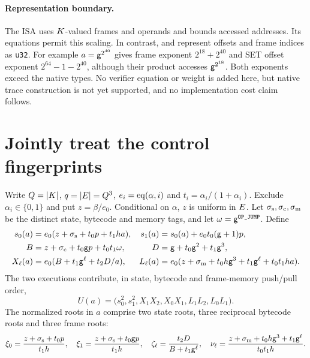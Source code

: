 \documentclass[11pt]{article}
\begin{document}
\paragraph{Representation boundary.} The ISA uses $K$-valued frames and operands and bounds accessed addresses. Its equations permit this scaling. In contrast,  and  represent offsets and frame indices as \texttt{u32}. For example $a=\mathsf{g}^{2^{40}}$ gives frame exponent $2^{18}+2^{40}$ and SET offset exponent $2^{64}-1-2^{40}$, although their product accesses $\mathsf{g}^{2^{18}}$. Both exponents exceed the native types. No verifier equation or weight is added here, but native trace construction is not yet supported, and no implementation cost claim follows.

\section{Jointly treat the control fingerprints}

Write $Q=|K|$, $q=|E|=Q^3$, $e_i=\operatorname{eq}(\alpha,i)$ and $t_i=\alpha_i/(1+\alpha_i)$. Exclude $\alpha_i\in\{0,1\}$ and put $z=\beta/e_0$. Conditional on $\alpha$, $z$ is uniform in $E$. Let $\sigma_{\rm s},\sigma_{\rm c},\sigma_{\rm m}$ be the distinct state, bytecode and memory tags, and let $\omega=\mathsf{g}^{\texttt{OP\_JUMP}}$. Define
\[
\begin{aligned}
 s_0(a)&=e_0(z+\sigma_{\rm s}+t_0p+t_1ha),&
 s_1(a)&=s_0(a)+e_0t_0(\mathsf{g}+1)p,\\
 B&=z+\sigma_{\rm c}+t_0\mathsf{g} p+t_0t_1\omega,&
 D&=\mathsf{g}+t_0\mathsf{g}^2+t_1\mathsf{g}^3,\\
 X_\ell(a)&=e_0(B+t_1\mathsf{g}^\ell+t_2D/a),&
 L_\ell(a)&=e_0(z+\sigma_{\rm m}+t_0h\mathsf{g}^3+t_1\mathsf{g}^\ell+t_0t_1ha).
\end{aligned}
\]
The two executions contribute, in state, bytecode and frame-memory push/pull order,
\[
 U(a)=\bigl(s_0^2,s_1^2,X_1X_2,X_0X_1,L_1L_2,L_0L_1\bigr).
\]
The normalized roots in $a$ comprise two state roots, three reciprocal bytecode roots and three frame roots:
\[
 \xi_0=\frac{z+\sigma_{\rm s}+t_0p}{t_1h},\quad
 \xi_1=\frac{z+\sigma_{\rm s}+t_0\mathsf{g} p}{t_1h},\quad
 \zeta_\ell=\frac{t_2D}{B+t_1\mathsf{g}^\ell},\quad
 \nu_\ell=\frac{z+\sigma_{\rm m}+t_0h\mathsf{g}^3+t_1\mathsf{g}^\ell}{t_0t_1h}.
\]
\end{document}
